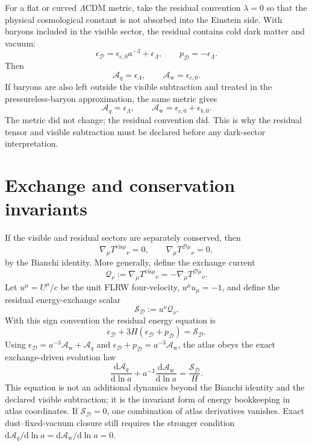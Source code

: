 \documentclass[
  aps,
  prd,
  reprint,
  superscriptaddress,
  floatfix,
  nofootinbib,
  longbibliography
]{revtex4-2}
\theoremstyle{plain}
\theoremstyle{definition}
\theoremstyle{remark}
\newcommand{\dd}{\mathrm d}
\newcommand{\D}{\mathcal D}
\newcommand{\vis}{\mathrm{vis}}
\newcommand{\Aq}{\mathcal A_q}
\newcommand{\Aw}{\mathcal A_{\mathrm w}}
\newcommand{\LCDM}{\Lambda\mathrm{CDM}}
\newcommand{\Qcal}{\mathcal Q}
\newcommand{\Scal}{\mathcal S}
\begin{document}
For a flat or curved $\LCDM$ metric, take the residual convention $\lambda=0$ so that the physical cosmological constant is not absorbed into the Einstein side.  With baryons included in the visible sector, the residual contains cold dark matter and vacuum:
\begin{equation}
\epsilon_\D=\epsilon_{c,0}a^{-3}+\epsilon_\Lambda,
\qquad
p_\D=-\epsilon_\Lambda.
\end{equation}
Then
\begin{equation}
\Aq=\epsilon_\Lambda,
\qquad
\Aw=\epsilon_{c,0}.
\label{eq:lcdm_audit_cdm}
\end{equation}
If baryons are also left outside the visible subtraction and treated in the pressureless-baryon approximation, the same metric gives
\begin{equation}
\Aq=\epsilon_\Lambda,
\qquad
\Aw=\epsilon_{c,0}+\epsilon_{b,0}.
\label{eq:lcdm_audit_baryon}
\end{equation}
The metric did not change; the residual convention did.  This is why the residual tensor and visible subtraction must be declared before any dark-sector interpretation.

\section{Exchange and conservation invariants}

If the visible and residual sectors are separately conserved, then
\begin{equation}
\nabla_\mu T^{\vis\mu}{}_{\nu}=0,
\qquad
\nabla_\mu T^{\D\mu}{}_{\nu}=0,
\end{equation}
by the Bianchi identity.  More generally, define the exchange current
\begin{equation}
\Qcal_\nu:=\nabla_\mu T^{\vis\mu}{}_{\nu}=-\nabla_\mu T^{\D\mu}{}_{\nu}.
\label{eq:exchange_current}
\end{equation}
Let $u^\mu=U^\mu/c$ be the unit FLRW four-velocity, $u^\mu u_\mu=-1$, and define the residual energy-exchange scalar
\begin{equation}
\Scal_\D:=u^\nu\Qcal_\nu .
\label{eq:energy_exchange_scalar}
\end{equation}
With this sign convention the residual energy equation is
\begin{equation}
\dot\epsilon_\D+3H(\epsilon_\D+p_\D)=\Scal_\D .
\label{eq:residual_continuity_exchange}
\end{equation}
Using $\epsilon_\D=a^{-3}\Aw+\Aq$ and $\epsilon_\D+p_\D=a^{-3}\Aw$, the atlas obeys the exact exchange-driven evolution law
\begin{equation}
\boxed{
\frac{\dd\Aq}{\dd\ln a}+a^{-3}\frac{\dd\Aw}{\dd\ln a}
=\frac{\Scal_\D}{H} .}
\label{eq:atlas_evolution_exchange}
\end{equation}
This equation is not an additional dynamics beyond the Bianchi identity and the declared visible subtraction; it is the invariant form of energy bookkeeping in atlas coordinates.  If $\Scal_\D=0$, one combination of atlas derivatives vanishes.  Exact dust--fixed-vacuum closure still requires the stronger condition $\dd\Aq/\dd\ln a=\dd\Aw/\dd\ln a=0$.
\end{document}
